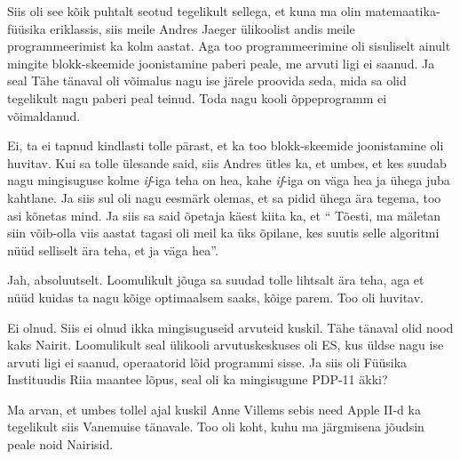 
Siis oli see kõik puhtalt seotud tegelikult sellega, et kuna ma olin 
matemaatika-füüsika eriklassis, siis meile Andres Jaeger ülikoolist andis meile programmeerimist ka kolm aastat. Aga too 
programmeerimine oli sisuliselt ainult mingite blokk-skeemide joonistamine 
paberi peale, me arvuti ligi ei saanud. Ja seal Tähe tänaval oli võimalus nagu 
ise järele proovida  seda, mida sa olid tegelikult nagu paberi peal teinud. 
Toda nagu kooli õppeprogramm ei võimaldanud.


Ei, ta ei tapnud kindlasti tolle pärast, et ka too blokk-skeemide joonistamine 
oli huvitav. Kui sa tolle ülesande said, siis Andres ütles ka, et umbes, et kes 
suudab nagu mingisuguse kolme \emph{if}-iga teha on hea, kahe \emph{if}-iga on 
väga hea ja ühega juba kahtlane. Ja siis sul oli nagu eesmärk olemas, et sa 
pidid ühega ära tegema, too asi kõnetas mind. Ja siis sa said õpetaja käest 
kiita ka, et \enquote{ Tõesti, ma mäletan siin võib-olla viis aastat tagasi oli 
meil ka üks õpilane, kes suutis  selle algoritmi nüüd selliselt ära teha, et ja 
väga hea}.


Jah, absoluutselt. Loomulikult jõuga sa suudad tolle  lihtsalt ära teha, aga et 
nüüd kuidas ta nagu kõige optimaalsem saaks, kõige parem. Too oli huvitav.


Ei olnud. Siis ei olnud ikka mingisuguseid arvuteid kuskil. Tähe tänaval olid 
nood kaks Nairit. Loomulikult seal ülikooli arvutuskeskuses oli ES, kus üldse nagu ise arvuti 
ligi ei saanud,  operaatorid lõid programmi sisse. Ja siis oli Füüsika 
Instituudis Riia maantee lõpus, seal oli ka 
mingisugune PDP-11 äkki?

Ma arvan, et umbes tollel ajal kuskil Anne Villems 
sebis need Apple II-d ka tegelikult siis Vanemuise 
tänavale. Too oli koht, kuhu ma 
järgmisena jõudsin peale noid Nairisid.  

